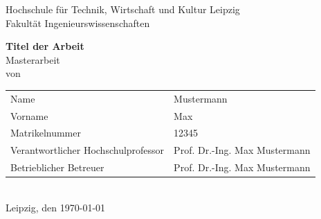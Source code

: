 \thispagestyle{empty}
\begin{singlespacing}				%
\begin{center}
\begin{verbatim}
\end{verbatim}

\hspace{\fill}

\vspace{15mm}
\Large{Hochschule für Technik, Wirtschaft und Kultur Leipzig}\\
\large{Fakultät Ingenieurswissenschaften}\\
\vspace{25mm}


\LARGE{\textbf{Titel der Arbeit}}\\\vspace{15mm}
\Large{Masterarbeit}\\
{\normalsize
von}\\
\vspace{25mm}
{\normalsize 
\begin{tabular}{ll}
Name	&	Mustermann	\\
Vorname &	Max	\\
Matrikelnummer	&	12345	\\
Verantwortlicher Hochschulprofessor	&	Prof. Dr.-Ing. Max Mustermann	\\
Betrieblicher Betreuer	&	Prof. Dr.-Ing. Max Mustermann	\\
\end{tabular}
}\\
\vspace{20mm}
{\normalsize Leipzig, den \today}
\end{center}
\end{singlespacing}				%

